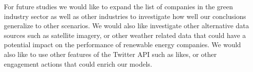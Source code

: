\documentclass[sigconf, nonacm]{acmart}
\begin{document}
For future studies we would like to expand the list of companies in the green industry sector as well as other industries to investigate how well our conclusions generalize to other scenarios. We would also like investigate other alternative data sources such as satellite imagery, or other weather related data that could have a potential impact on the performance of renewable energy companies. We would also like to use other features of the Twitter API such as likes, or other engagement actions that could enrich our models. 


\end{document}
